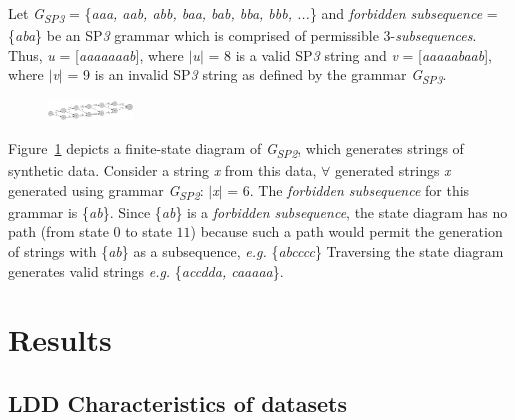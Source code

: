 \documentclass[a0,portrait]{a0poster}
\begin{document}
\begin{multicols}{2}
Let \emph{G\textsubscript{SP\emph{3}}}  = \{\emph{aaa, aab, abb, baa, bab, bba, bbb, ...}\} and \emph{forbidden subsequence} = \{\emph{aba}\} be an SP\emph{3} grammar which is comprised of permissible $3$-\emph{subsequences}. Thus, \emph{u} = [\emph{aaaaaaab}], where \( \vert \)\emph{u}\( \vert \) = 8 is a valid SP\emph{3} string and \emph{v} = [\emph{aaaaabaab}], where \( \vert \)\emph{v}\( \vert \) = 9 is an invalid SP\emph{3} string as defined by the grammar \emph{G\textsubscript{SP\emph{3}}}.

\begin{figure}
\begin{center}
\includegraphics[width=0.2\textwidth]{fsa1.png}
\label{fig:fsa1}
\end{center}
\end{figure}

Figure~\ref{fig:fsa1} depicts a finite-state diagram of \emph{G\textsubscript{SP2}}, which generates strings of synthetic data. Consider a string \emph{x} from this data, \( \forall \) generated strings \emph{x} generated using grammar \emph{G\textsubscript{SP2}}: \( \vert \)\emph{x}\( \vert \) = $6$. The \emph{forbidden subsequence} for this grammar is \{\emph{ab}\}. Since \{\emph{ab}\} is a \emph{forbidden subsequence}, the state diagram has no path (from state $0$ to state $11$) because such a path would permit the generation of strings with \{\emph{ab}\} as a subsequence, \emph{e.g.} \{\emph{abcccc}\} 
Traversing the state diagram generates valid strings \emph{e.g.} \{\emph{accdda, caaaaa}\}.


\section*{Results}

\subsection*{LDD Characteristics of datasets}


\end{multicols}
\end{document}
